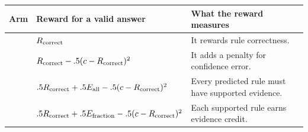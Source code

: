 \par{}\par\begingroup\small\setlength{\tabcolsep}{4pt}
\begin{tabularx}{\linewidth}{@{}l l X@{}}\toprule
Arm & Reward for a valid answer & What the reward measures\\\midrule
\armA{} & $R_{\rm correct}$ & It rewards rule correctness.\\
\armB{} & $R_{\rm correct}-.5(c-R_{\rm correct})^2$ & It adds a penalty for confidence error.\\
\armC{} & $.5R_{\rm correct}+.5E_{\rm all}-.5(c-R_{\rm correct})^2$ & Every predicted rule must have supported evidence.\\
\armD{} & $.5R_{\rm correct}+.5E_{\rm fraction}-.5(c-R_{\rm correct})^2$ & Each supported rule earns evidence credit.\\\bottomrule
\end{tabularx}\endgroup
